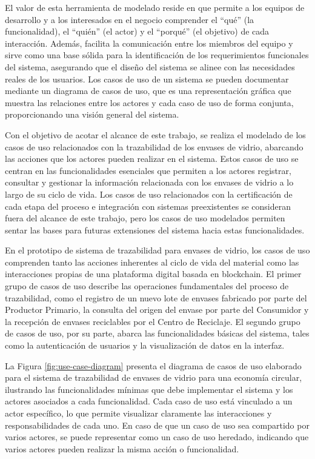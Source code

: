El valor de esta herramienta de modelado reside en que permite a los equipos de desarrollo y a los interesados en el negocio comprender el ``qué'' (la funcionalidad), el ``quién'' (el actor) y el ``porqué'' (el objetivo) de cada interacción. Además, facilita la comunicación entre los miembros del equipo y sirve como una base sólida para la identificación de los requerimientos funcionales del sistema, asegurando que el diseño del sistema se alinee con las necesidades reales de los usuarios. Los casos de uso de un sistema se pueden documentar mediante un diagrama de casos de uso, que es una representación gráfica que muestra las relaciones entre los actores y cada caso de uso de forma conjunta, proporcionando una visión general del sistema.

Con el objetivo de acotar el alcance de este trabajo, se realiza el modelado de los casos de uso relacionados con la trazabilidad de los envases de vidrio, abarcando las acciones que los actores pueden realizar en el sistema. Estos casos de uso se centran en las funcionalidades esenciales que permiten a los actores registrar, consultar y gestionar la información relacionada con los envases de vidrio a lo largo de su ciclo de vida. Los casos de uso relacionados con la certificación de cada etapa del proceso e integración con sistemas preexistentes se consideran fuera del alcance de este trabajo, pero los casos de uso modelados permiten sentar las bases para futuras extensiones del sistema hacia estas funcionalidades.

En el prototipo de sistema de trazabilidad para envases de vidrio, los casos de uso comprenden tanto las acciones inherentes al ciclo de vida del material como las interacciones propias de una plataforma digital basada en blockchain. El primer grupo de casos de uso describe las operaciones fundamentales del proceso de trazabilidad, como el registro de un nuevo lote de envases fabricado por parte del Productor Primario, la consulta del origen del envase por parte del Consumidor y la recepción de envases reciclables por el Centro de Reciclaje. El segundo grupo de casos de uso, por su parte, abarca las funcionalidades básicas del sistema, tales como la autenticación de usuarios y la visualización de datos en la interfaz.

La Figura \ref{fig:use-case-diagram} presenta el diagrama de casos de uso elaborado para el sistema de trazabilidad de envases de vidrio para una economía circular, ilustrando las funcionalidades mínimas que debe implementar el sistema y los actores asociados a cada funcionalidad. Cada caso de uso está vinculado a un actor específico, lo que permite visualizar claramente las interacciones y responsabilidades de cada uno. En caso de que un caso de uso sea compartido por varios actores, se puede representar como un caso de uso heredado, indicando que varios actores pueden realizar la misma acción o funcionalidad.

